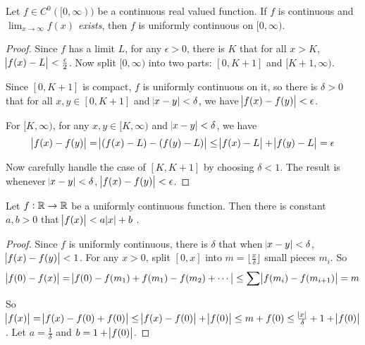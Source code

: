 \begin{theorem}
    Let $f \in C^0([0,\infty))$ be a continuous real valued function. If $f$ is continuous and \emph{$\displaystyle \lim_{x\rightarrow \infty} f(x)$ exists}, then $f$ is uniformly continuous on $[0, \infty)$.
\end{theorem}
\begin{proof}
    Since $f$ has a limit $L$, for any $\epsilon > 0$, there is $K$ that for all $x > K$, $\abs{f(x) - L} < \frac{\epsilon}{2}$. Now split $[0, \infty)$ into two parts: $[0, K+1]$ and $[K+1, \infty)$.
    
    Since $[0, K+1]$ is compact, $f$ is uniformly continuous on it, so there is $\delta>0$ that for all $x,y \in [0,K+1]$ and $\abs{x-y} < \delta$, we have $\abs{f(x) - f(y)} < \epsilon$.
    
    For $[K, \infty)$, for any $x,y \in [K, \infty)$ and $\abs{x - y} < \delta$, we have
    \begin{equation*}
        \abs{f(x) - f(y)} = \abs{(f(x) - L) - (f(y) - L)} \leq \abs{f(x) - L} + \abs{f(y) - L} = \epsilon
    \end{equation*}
    
    Now carefully handle the case of $[K, K+1]$ by choosing $\delta < 1$. The result is whenever $\abs{x - y } < \delta$, $\abs{f(x) - f(y)} < \epsilon$.
\end{proof}

\begin{theorem}\label{uniform_on_r_with_linear_function}
    Let $f:\mathbb{R} \rightarrow \mathbb{R}$ be a uniformly continuous function. Then there is constant $a,b >0$ that $\abs{f(x)} < a \abs{x} + b$    .
\end{theorem}
\begin{proof}
    Since $f$ is uniformly continuous, there is $\delta$ that when $\abs{x-y} < \delta$, $\abs{f(x) - f(y)} < 1$. For any $x > 0$, split $[0,x]$ into $m = \lfloor \frac{x}{\delta} \rfloor$ small pieces $m_i$. So
    \begin{equation*}
        \abs{f(0) - f(x)} = \abs{f(0) - f(m_1) + f(m_1) - f(m_2) + \cdots} \leq \sum \abs{f(m_i) - f(m_{i+1})} = m
    \end{equation*}
    
    So $\abs{f(x)} = \abs{f(x) - f(0) + f(0)} \leq \abs{f(x) - f(0)} + \abs{f(0)} \leq m + f(0) \leq \frac{\abs{x}}{\delta} + 1 + \abs{f(0)}$. Let $a = \frac{1}{\delta}$ and $b = 1 + \abs{f(0)}$.
\end{proof}


